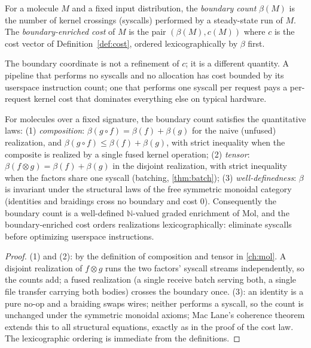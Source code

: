 \begin{definition}\label{def:boundary}
For a molecule $M$ and a fixed input distribution, the \emph{boundary
count} $\beta (M)$ is the number of kernel crossings (syscalls)
performed by a steady-state run of $M$. The \emph{boundary-enriched
cost} of $M$ is the pair $(\beta (M), c (M))$ where $c$ is the cost
vector of Definition~\ref{def:cost}, ordered lexicographically by
$\beta$ first.
\end{definition}

The boundary coordinate is not a refinement of $c$; it is a different
quantity. A pipeline that performs no syscalls and no allocation has
cost bounded by its userspace instruction count; one that performs one
syscall per request pays a per-request kernel cost that dominates
everything else on typical hardware.

\begin{theorem}\label{thm:56}\label{thm:boundary}
For molecules over a fixed signature, the boundary count satisfies the
quantitative laws:
(1) \emph{composition}: $\beta (g \circ f) = \beta (f) + \beta (g)$ for
the naive (unfused) realization, and $\beta (g \circ f) \leq \beta (f) +
\beta (g)$, with strict inequality when the composite is realized by a
single fused kernel operation;
(2) \emph{tensor}: $\beta (f \otimes g) = \beta (f) + \beta (g)$ in the
disjoint realization, with strict inequality when the factors share one
syscall (batching, \autoref{thm:batch});
(3) \emph{well-definedness}: $\beta$ is invariant under the structural
laws of the free symmetric monoidal category (identities and braidings
cross no boundary and cost $0$).
Consequently the boundary count is a well-defined
$\mathbb{N}$-valued graded enrichment of Mol, and the
boundary-enriched cost orders realizations lexicographically:
eliminate syscalls before optimizing userspace instructions.
\end{theorem}

\begin{proof}
(1) and (2): by the definition of composition and tensor in
\autoref{ch:mol}. A disjoint realization of $f \otimes g$ runs the two
factors' syscall streams independently, so the counts add; a fused
realization (a single receive batch serving both, a single file
transfer carrying both bodies) crosses the boundary once. (3): an
identity is a pure no-op and a braiding swaps wires; neither performs
a syscall, so the count is unchanged under the symmetric monoidal
axioms; Mac Lane's coherence theorem \citep{maclane} extends this to
all structural equations, exactly as in the proof of the cost law.
The lexicographic ordering is immediate from the definitions.
\end{proof}

